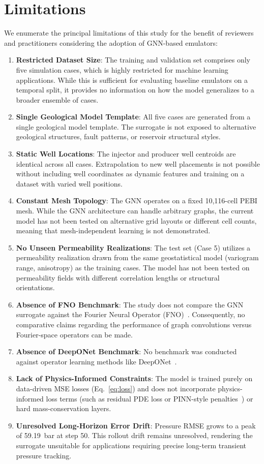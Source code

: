 \section{Limitations}
We enumerate the principal limitations of this study for the benefit of reviewers and practitioners considering the adoption of GNN-based emulators:
\begin{enumerate}
    \item \textbf{Restricted Dataset Size}: The training and validation set comprises only five simulation cases, which is highly restricted for machine learning applications. While this is sufficient for evaluating baseline emulators on a temporal split, it provides no information on how the model generalizes to a broader ensemble of cases.
    \item \textbf{Single Geological Model Template}: All five cases are generated from a single geological model template. The surrogate is not exposed to alternative geological structures, fault patterns, or reservoir structural styles.
    \item \textbf{Static Well Locations}: The injector and producer well centroids are identical across all cases. Extrapolation to new well placements is not possible without including well coordinates as dynamic features and training on a dataset with varied well positions.
    \item \textbf{Constant Mesh Topology}: The GNN operates on a fixed 10,116-cell PEBI mesh. While the GNN architecture can handle arbitrary graphs, the current model has not been tested on alternative grid layouts or different cell counts, meaning that mesh-independent learning is not demonstrated.
    \item \textbf{No Unseen Permeability Realizations}: The test set (Case 5) utilizes a permeability realization drawn from the same geostatistical model (variogram range, anisotropy) as the training cases. The model has not been tested on permeability fields with different correlation lengths or structural orientations.
    \item \textbf{Absence of FNO Benchmark}: The study does not compare the GNN surrogate against the Fourier Neural Operator (FNO)~\cite{li2020fno}. Consequently, no comparative claims regarding the performance of graph convolutions versus Fourier-space operators can be made.
    \item \textbf{Absence of DeepONet Benchmark}: No benchmark was conducted against operator learning methods like DeepONet~\cite{lu2021deeponet}.
    \item \textbf{Lack of Physics-Informed Constraints}: The model is trained purely on data-driven MSE losses (Eq.~\ref{eq:loss}) and does not incorporate physics-informed loss terms (such as residual PDE loss or PINN-style penalties~\cite{raissi2019pinn}) or hard mass-conservation layers.
    \item \textbf{Unresolved Long-Horizon Error Drift}: Pressure RMSE grows to a peak of 59.19~bar at step 50. This rollout drift remains unresolved, rendering the surrogate unsuitable for applications requiring precise long-term transient pressure tracking.
\end{enumerate}
